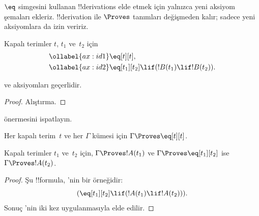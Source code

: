 \documentclass[../../../include/open-logic-section]{subfiles}
\begin{document}


$\eq$ simgesini kullanan !!{derivation}s elde etmek için yalnızca yeni aksiyom
şemaları ekleriz. !!{derivation} ile $\Proves$ tanımları değişmeden kalır;
sadece yeni aksiyomlara da izin veririz.

\begin{defn}
Kapalı terimler $t$, $t_1$ ve~$t_2$ için
\begin{align}
\ollabel{ax:id1} & \eq[t][t], \\
\ollabel{ax:id2} & \eq[t_1][t_2] \lif (!B(t_1) \lif !B(t_2)).
\end{align}
\end{defn}

\begin{prop}
   ve  aksiyomları geçerlidir.
\end{prop}

\begin{proof}
  Alıştırma.
\end{proof}

\begin{prob}
 önermesini ispatlayın.
\end{prob}

\begin{prop}
 Her kapalı terim~$t$ ve her $\Gamma$ kümesi için $\Gamma \Proves \eq[t][t]$.
\end{prop}

\begin{prop}
  Kapalı terimler $t_1$ ve~$t_2$ için, $\Gamma \Proves !A(t_1)$ ve
  $\Gamma \Proves \eq[t_1][t_2]$ ise
  $\Gamma \Proves !A(t_2)$.
\end{prop}

\begin{proof}
Şu !!{formula}, 'nin bir örneğidir:
\[
(\eq[t_1][t_2] \lif (!A(t_1) \lif !A(t_2))).
\]
Sonuç \MP{}'nin iki kez uygulanmasıyla elde edilir.
\end{proof}
\end{document}
